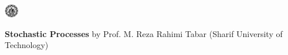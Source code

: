 \documentclass[9pt, purple]{./template/cv} %
\begin{document}
\begin{minipage}{\linewidth}
\begin{minipage}[t]{\linewidth}
    \end{minipage}

    \vspace{0.3cm}
    
    \begin{minipage}[t]{\linewidth}
    
        \begin{minipage}{1cm}
            \vspace{-\baselineskip}
            \includegraphics[width=6mm]{img/sharif}\centering
        \end{minipage}
        \begin{minipage}{0.8\linewidth}
            \vspace{-\baselineskip}
            \textcolor{text!85}{\textbf{Stochastic Processes} \space \pipe \space by Prof. M. Reza Rahimi Tabar (Sharif University of Technology)}
        \end{minipage}
    
    \end{minipage}
    
\end{minipage}

\vspace{-2mm}

\vspace{0.3cm}
\end{document}
